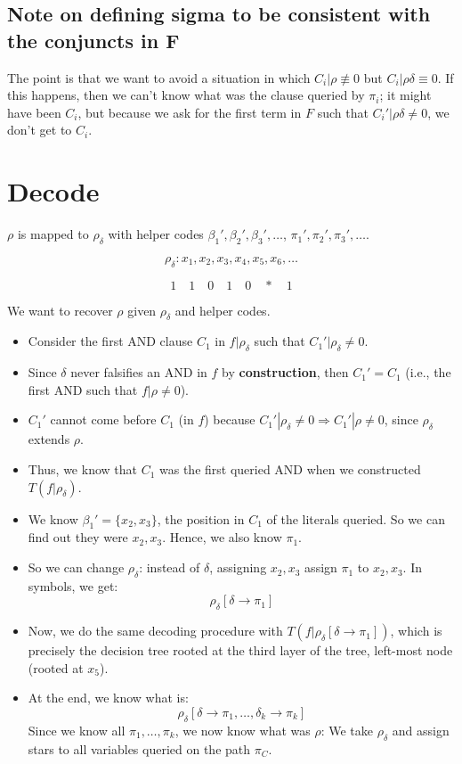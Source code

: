 \subsection*{Note on defining sigma to be consistent with the conjuncts in F}
\noindent
The point is that we want to avoid a situation in which \( C_i | \rho \not\equiv 0 \) but \( C_i | \rho\delta \equiv 0 \). If this happens, then we can't know what was the clause queried by \( \pi_i \); it might have been \( C_i \), but because we ask for the first term in \( F \) such that \( C_i' | \rho\delta \neq 0 \), we don't get to \( C_i \).


\section*{Decode}
\noindent
\( \rho \) is mapped to \( \rho_{\delta} \) with helper codes \( \beta_1', \beta_2', \beta_3', \dots \), \( \pi_1', \pi_2', \pi_3', \dots \).

\[
\rho_{\delta} : x_1, x_2, x_3, x_4, x_5, x_6, \dots
\]

\[
1 \quad 1 \quad 0 \quad 1 \quad 0 \quad * \quad 1
\]

\noindent
We want to recover \( \rho \) given \( \rho_{\delta} \) and helper codes.

\begin{itemize}
    \item Consider the first AND clause \( C_1 \) in \( f | \rho_{\delta} \) such that \( C_1' | \rho_{\delta} \neq 0 \).
    \item Since \( \delta \) never falsifies an AND in \( f \) by \textbf{construction}, then \( C_1' = C_1 \) (i.e., the first AND such that \( f | \rho \neq 0 \)).
    \item \( C_1' \) cannot come before \( C_1 \) (in \( f \)) because \( C_1' | \rho_{\delta} \neq 0 \Rightarrow C_1' | \rho \neq 0 \), since \( \rho_{\delta} \) extends \( \rho \).
    \item Thus, we know that \( C_1 \) was the first queried AND when we constructed \( T(f | \rho_{\delta}) \).
    \item We know \( \beta_1' = \{ x_2, x_3 \} \), the position in \( C_1 \) of the literals queried. So we can find out they were \( x_2, x_3 \). Hence, we also know \( \pi_1 \).
    \item So we can change \( \rho_{\delta} \): instead of \( \delta \), assigning \( x_2, x_3 \) assign \( \pi_1 \) to \( x_2, x_3 \). In symbols, we get:
    \[
    \rho_{\delta} [\delta \to \pi_1]
    \]
    \item Now, we do the same decoding procedure with \( T(f | \rho_{\delta} [\delta \to \pi_1]) \), which is precisely the decision tree rooted at the third layer of the tree, left-most node (rooted at $x_5$).
    \item At the end, we know what is:
    \[
    \rho_{\delta} [\delta \to \pi_1, \dots, \delta_k \to \pi_k]
    \]
    Since we know all \( \pi_1, \dots, \pi_k \), we now know what was \( \rho \): We take \( \rho_{\delta} \) and assign stars to all variables queried on the path \( \pi_C \).
\end{itemize}

